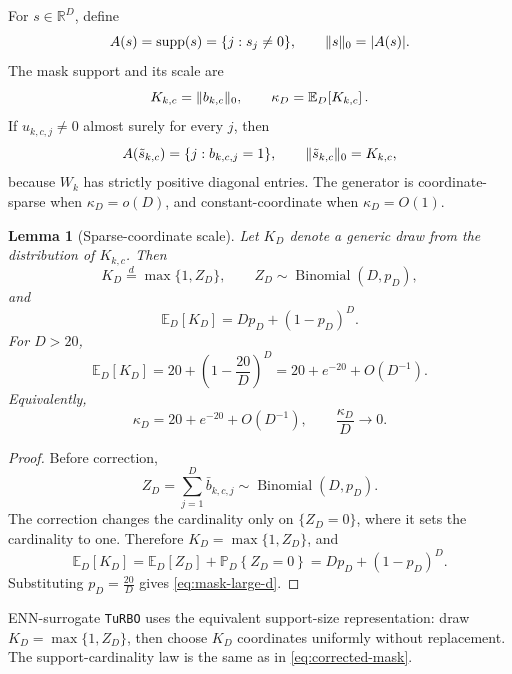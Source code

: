 \documentclass[10pt]{article}
\numberwithin{equation}{section}
\newcommand{\TuRBO}{\textnormal{\texttt{TuRBO}}}
\newcommand{\R}{\mathbb{R}}
\DeclareMathOperator{\supp}{supp}
\DeclareMathOperator{\Bin}{Binomial}
\DeclarePairedDelimiter{\norm}{\lVert}{\rVert}
\DeclarePairedDelimiter{\card}{\lvert}{\rvert}
\theoremstyle{plain}
\newtheorem{lemma}{Lemma}
\theoremstyle{definition}
\theoremstyle{remark}
\begin{document}
For \(s\in\R^D\), define
\begin{equation}
  A(s)=\supp(s)=\{j:s_j\ne0\},
  \qquad
  \norm{s}_0=\card{A(s)}.
  \label{eq:active-set}
\end{equation}
The mask support and its scale are
\begin{equation}
  K_{k,c}=\norm{b_{k,c}}_0,
  \qquad
  \kappa_D=\mathbb{E}_D\!\left[K_{k,c}\right].
  \label{eq:kappa-def}
\end{equation}
If \(u_{k,c,j}\ne0\) almost surely for every \(j\), then
\begin{equation}
  A(\tilde s_{k,c})=\{j:b_{k,c,j}=1\},
  \qquad
  \norm{\tilde s_{k,c}}_0=K_{k,c},
  \label{eq:mask-step-support}
\end{equation}
because \(W_k\) has strictly positive diagonal entries.
The generator is coordinate-sparse when \(\kappa_D=o(D)\), and
constant-coordinate when \(\kappa_D=O(1)\).

\begin{lemma}[Sparse-coordinate scale]
Let \(K_D\) denote a generic draw from the distribution of \(K_{k,c}\).  Then
\begin{equation}
  K_D\stackrel{d}{=}\max\{1,Z_D\},
  \qquad
  Z_D\sim\Bin(D,p_D),
  \label{eq:mask-dist}
\end{equation}
and
\begin{equation}
  \mathbb{E}_D\!\left[K_D\right] = Dp_D+(1-p_D)^D.
  \label{eq:mask-mean}
\end{equation}
For \(D>20\),
\begin{equation}
  \mathbb{E}_D\!\left[K_D\right]
  =
  20+\left(1-\frac{20}{D}\right)^D
  =
  20+e^{-20}+O(D^{-1}).
  \label{eq:mask-large-d}
\end{equation}
Equivalently,
\[
  \kappa_D=20+e^{-20}+O(D^{-1}),
  \qquad
  \frac{\kappa_D}{D}\to0 .
\]
\end{lemma}

\begin{proof}
Before correction,
\[
  Z_D=\sum_{j=1}^{D}\bar b_{k,c,j}\sim\Bin(D,p_D).
\]
The correction changes the cardinality only on \(\{Z_D=0\}\),
where it sets the cardinality to one.  Therefore \(K_D=\max\{1,Z_D\}\), and
\[
  \mathbb{E}_D\!\left[K_D\right]
  =
  \mathbb{E}_D\!\left[Z_D\right]
  +
  \mathbb{P}_D\!\left\{Z_D=0\right\}
  =
  Dp_D+(1-p_D)^D.
\]
Substituting \(p_D=\frac{20}{D}\) gives \eqref{eq:mask-large-d}.
\end{proof}

ENN-surrogate \TuRBO{} uses the equivalent support-size representation: draw
\(K_D=\max\{1,Z_D\}\), then choose \(K_D\) coordinates uniformly without
replacement.  The support-cardinality law is the same as in
\eqref{eq:corrected-mask}.
\end{document}
